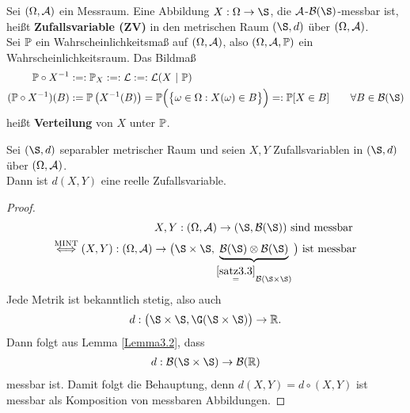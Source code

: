 \begin{definition} %
Sei $(\Omega,\A)$ ein Messraum. Eine Abbildung
$X:\Omega\to\S$, die $\A$-$\B(\S)$-messbar ist, heißt \textbf{Zufallsvariable (ZV)} in den metrischen Raum $(\S,d)$ über $(\Omega,\A)$.\\

Sei $\P$ ein Wahrscheinlichkeitsmaß auf $(\Omega,\A)$, also $(\Omega,\A,\P)$ ein Wahrscheinlichkeitsraum. Das Bildmaß
\begin{align*}
\P\circ X^{-1}&:=:\P_X:=:\mathcal{L}:=:\mathcal{L}(X~|~\P)\\
(\P\circ X^{-1})(B)&:=\P\left(X^{-1}(B)\right)=\P\Big(\big\lbrace\omega\in\Omega:X(\omega)\in B\big\rbrace\Big)
=: \P[X\in B]
\qquad\forall B\in\B(\S)
\end{align*}
heißt \textbf{Verteilung} von $X$ unter $\P$.
\end{definition}

\begin{satz}\label{Satz3.5} %
Sei $(\S,d)$ separabler metrischer Raum und seien $X,Y$ Zufallsvariablen in $(\S,d)$ über $(\Omega,\A)$.\\
Dann ist $d(X,Y)$ eine reelle Zufallsvariable.
\end{satz}

\begin{proof}
\begin{align*}
X,Y:(\Omega,\A)\to(\S,\B(\S))\text{ sind messbar }\\
\stackrel{\text{MINT}}{\Longleftrightarrow}
(X,Y):(\Omega,\A)\to\big(\S\times\S,\underbrace{\B(\S)\otimes\B(\S)}_{\stackeq{\ref{satz3.3}}\B(\S\times\S)}\big)\text{ ist messbar}\\
\end{align*}
Jede Metrik ist bekanntlich stetig, also auch
\begin{align*}
d:\big(\S\times\S,\G(\S\times\S)\big)\to\R.
\end{align*}
Dann folgt aus Lemma \ref{Lemma3.2}, dass
\begin{align*}
d:\B(\S\times\S)\to\B(\R)
\end{align*}
messbar ist. Damit folgt die Behauptung, denn $d(X,Y)=d\circ(X,Y)$ ist messbar als Komposition von messbaren Abbildungen.
\end{proof}

